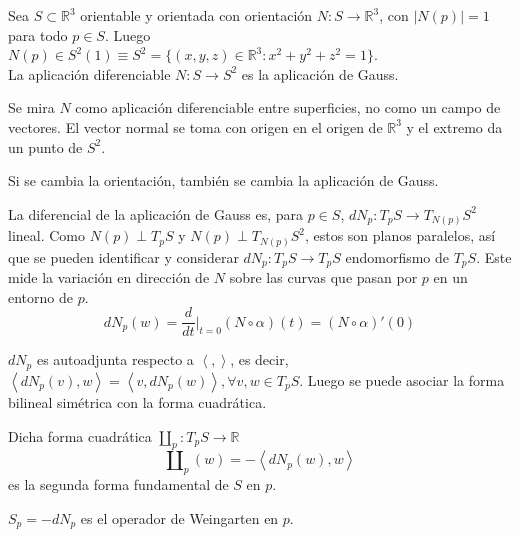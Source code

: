 \begin{definition}
    Sea $S \subset \mathbb{R}^3$ orientable y orientada con orientación $N : S \to \mathbb{R}^3$, con $|N(p)| = 1$ para todo $p \in S$.
    Luego $N(p) \in S^2(1) \equiv S^2 = \{ (x, y, z) \in \mathbb{R}^3 : x^2+y^2+z^2 = 1 \}$.\\
    La aplicación diferenciable $N : S \to S^2$ es la aplicación de Gauss.
\end{definition}

\begin{note}
    Se mira $N$ como aplicación diferenciable entre superficies, no como un campo de vectores.
    El vector normal se toma con origen en el origen de $\mathbb{R}^3$ y el extremo da un punto de $S^2$.
\end{note}

\begin{remark}
    Si se cambia la orientación, también se cambia la aplicación de Gauss.
\end{remark}

\begin{definition}
    La diferencial de la aplicación de Gauss es, para $p \in S$, $dN_p : T_pS \to T_{N(p)}S^2$ lineal.
    Como $N(p) \perp T_pS$ y $N(p) \perp T_{N(p)}S^2$, estos son planos paralelos, así que se pueden identificar y considerar $dN_p : T_pS \to T_pS$ endomorfismo de $T_pS$.
    Este mide la variación en dirección de $N$ sobre las curvas que pasan por $p$ en un entorno de $p$.
    $$dN_p(w) = \frac{d}{dt}|_{t=0} (N \circ \alpha)(t) = (N \circ \alpha)'(0)$$
\end{definition}

\begin{proposition}
    $dN_p$ es autoadjunta respecto a $\left\langle , \right\rangle$, es decir, $\left\langle dN_p(v), w \right\rangle = \left\langle v, dN_p(w) \right\rangle, \forall v, w \in T_pS$.
    Luego se puede asociar la forma bilineal simétrica con la forma cuadrática.
\end{proposition}

\begin{definition}
    Dicha forma cuadrática $\amalg_p : T_pS \to \mathbb{R}$
    $$\amalg_p(w) = -\left\langle dN_p(w), w \right\rangle$$
    es la segunda forma fundamental de $S$ en $p$.
\end{definition}

\begin{remark}
    $S_p = -dN_p$ es el operador de Weingarten en $p$.
\end{remark}

